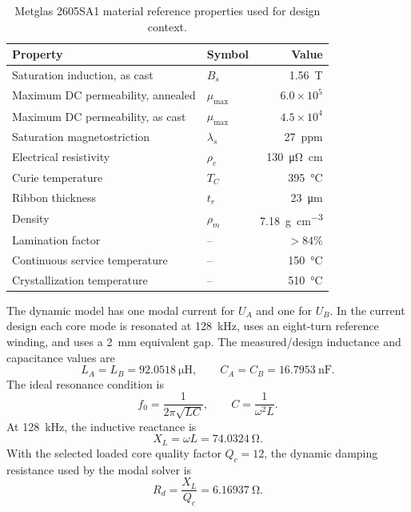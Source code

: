 \begin{table}[H]
\centering
\caption{Metglas 2605SA1 material reference properties used for design context.}
\label{tab:metglas2605sa1-properties}
\begin{tabular}{llr}
\toprule
Property & Symbol & Value \\
\midrule
Saturation induction, as cast & \(B_s\) & \SI{1.56}{\tesla} \\
Maximum DC permeability, annealed & \(\mu_{\max}\) & \(6.0\times10^5\) \\
Maximum DC permeability, as cast & \(\mu_{\max}\) & \(4.5\times10^4\) \\
Saturation magnetostriction & \(\lambda_s\) & \SI{27}{ppm} \\
Electrical resistivity & \(\rho_e\) & \SI{130}{\micro\ohm\centi\metre} \\
Curie temperature & \(T_C\) & \SI{395}{\celsius} \\
Ribbon thickness & \(t_r\) & \SI{23}{\micro\metre} \\
Density & \(\rho_m\) & \SI{7.18}{\gram\per\centi\metre\cubed} \\
Lamination factor & -- & \(>84\%\) \\
Continuous service temperature & -- & \SI{150}{\celsius} \\
Crystallization temperature & -- & \SI{510}{\celsius} \\
\bottomrule
\end{tabular}
\end{table}

The dynamic model has one modal current for \(U_A\) and one for \(U_B\). In the
current design each core mode is resonated at \SI{128}{\kilo\hertz}, uses an
eight-turn reference winding, and uses a \SI{2}{\milli\metre} equivalent gap.
The measured/design inductance and capacitance values are
\begin{equation}
L_A=L_B=\SI{92.0518}{\micro\henry}, \qquad
C_A=C_B=\SI{16.7953}{\nano\farad}.
\end{equation}
The ideal resonance condition is
\begin{equation}
f_0 = \frac{1}{2\pi\sqrt{LC}}, \qquad
C = \frac{1}{\omega^2 L}.
\end{equation}
At \SI{128}{\kilo\hertz}, the inductive reactance is
\begin{equation}
X_L = \omega L = \SI{74.0324}{\ohm}.
\end{equation}
With the selected loaded core quality factor \(Q_c=12\), the dynamic damping
resistance used by the modal solver is
\begin{equation}
R_d = \frac{X_L}{Q_c} = \SI{6.16937}{\ohm}.
\end{equation}

